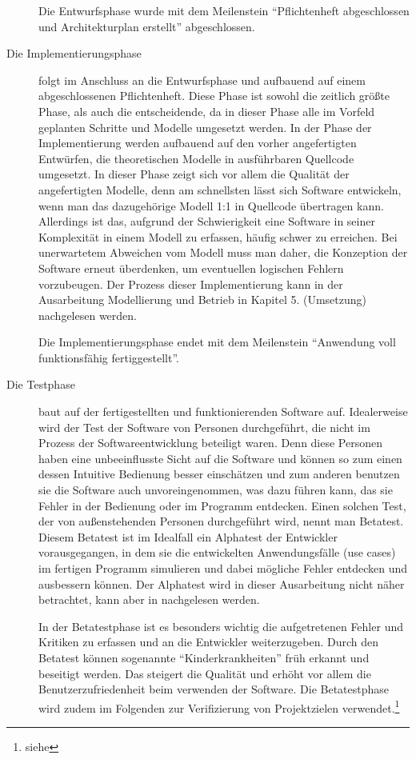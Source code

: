 \begin{description}
  Die Entwurfsphase wurde mit dem Meilenstein "`Pflichtenheft abgeschlossen und
  Architekturplan erstellt"' abgeschlossen.

  \item[Die Implementierungsphase] folgt im Anschluss an die Entwurfsphase und
  aufbauend auf einem abgeschlossenen Pflichtenheft. Diese Phase ist sowohl die
  zeitlich größte Phase, als auch die entscheidende, da in dieser Phase alle im
  Vorfeld geplanten Schritte und Modelle umgesetzt werden. In der Phase der
  Implementierung werden aufbauend auf den vorher angefertigten Entwürfen, die
  theoretischen Modelle in ausführbaren Quellcode umgesetzt. In dieser Phase
  zeigt sich vor allem die Qualität der angefertigten Modelle, denn am
  schnellsten lässt sich Software entwickeln, wenn man das dazugehörige Modell
  1:1 in Quellcode übertragen kann. Allerdings ist das, aufgrund der
  Schwierigkeit eine Software in seiner Komplexität in einem Modell zu erfassen,
  häufig schwer zu erreichen. Bei unerwartetem Abweichen vom Modell muss man
  daher, die Konzeption der Software erneut überdenken, um eventuellen logischen
  Fehlern vorzubeugen. Der Prozess dieser Implementierung kann in der
  Ausarbeitung Modellierung und Betrieb in Kapitel 5. (Umsetzung) nachgelesen werden.

  Die Implementierungsphase endet mit dem Meilenstein "`Anwendung voll
  funktionsfähig fertiggestellt"'.

  \item[Die Testphase] baut auf der fertigestellten und funktionierenden Software auf.
  Idealerweise wird der Test der Software von Personen durchgeführt, die nicht im Prozess der
  Softwareentwicklung beteiligt waren. Denn diese Personen haben eine
  unbeeinflusste Sicht auf die Software und können so zum einen dessen Intuitive
  Bedienung besser einschätzen und zum anderen benutzen sie die Software auch
  unvoreingenommen, was dazu führen kann, das sie Fehler in der Bedienung oder im
  Programm entdecken. Einen solchen Test, der von außenstehenden Personen
  durchgeführt wird, nennt man Betatest. Diesem Betatest ist im Idealfall ein
  Alphatest der Entwickler vorausgegangen, in dem sie die entwickelten
  Anwendungsfälle (use cases) im fertigen Programm simulieren und dabei mögliche
  Fehler entdecken und ausbessern können. Der Alphatest wird in dieser Ausarbeitung nicht näher betrachtet,
  kann aber in \citet{modelierungUndBetrieb2014} nachgelesen werden.

  In der Betatestphase ist es besonders wichtig die  aufgetretenen Fehler
  und Kritiken zu erfassen und an die Entwickler weiterzugeben. Durch den
  Betatest können sogenannte "`Kinderkrankheiten"' früh erkannt und beseitigt
  werden. Das steigert die Qualität und erhöht vor allem die
  Benutzerzufriedenheit beim verwenden der Software. Die Betatestphase wird zudem im Folgenden
  zur Verifizierung von Projektzielen verwendet.\footnote{siehe }


\end{description}
